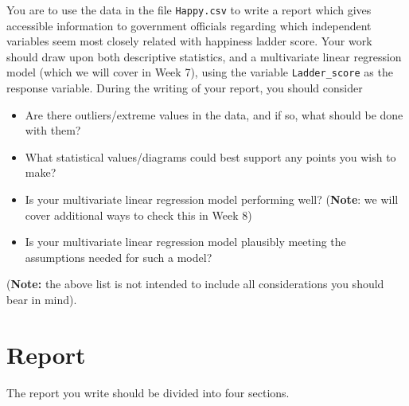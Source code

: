 \documentclass[11pt,a4paper]{article}
\begin{document}
You are to use the data in the file \texttt{Happy.csv} to write a report which gives accessible information to government officials regarding which independent variables seem most closely related with happiness ladder score. Your work should draw upon both descriptive statistics, and a multivariate linear regression model (which we will cover in Week 7), using the variable \texttt{Ladder\_score} as the response variable. During the writing of your report, you should consider
\begin{itemize}
\item Are there outliers/extreme values in the data, and if so, what should be done with them?
\item What statistical values/diagrams could best support any points you wish to make?
\item Is your multivariate linear regression model performing well? (\textbf{Note}: we will cover additional ways to check this in Week 8) 
\item Is your multivariate linear regression model plausibly meeting the assumptions needed for such a model?
\end{itemize}
(\textbf{Note:} the above list is not intended to include all considerations you should bear in mind).

\section{Report}

The report you write should be divided into four sections.
\end{document}
